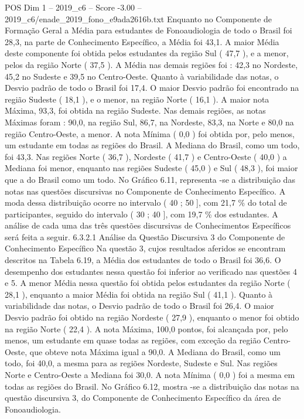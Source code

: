\begin{textsample}{POS Dim 1 – 2019\_c6 – Score -3.00 – 2019\_c6/enade\_2019\_fono\_e9ada2616b.txt}
Enquanto no Componente de Formação Geral a Média para estudantes de Fonoaudiologia de todo o Brasil foi 28,3, na parte de Conhecimento Específico, a Média foi 43,1.
A maior Média deste componente foi obtida pelos estudantes da região Sul ( 47,7 ), e a menor, pelos da região Norte ( 37,5 ).
A Média nas demais regiões foi : 42,3 no Nordeste, 45,2 no Sudeste e 39,5 no Centro-Oeste.
Quanto à variabilidade das notas, o Desvio padrão de todo o Brasil foi 17,4.
O maior Desvio padrão foi encontrado na região Sudeste ( 18,1 ), e o menor, na região Norte ( 16,1 ).
A maior nota Máxima, 93,3, foi obtida na região Sudeste.
Nas demais regiões, as notas Máximas foram : 90,0, na região Sul, 86,7, na Nordeste, 83,3, na Norte e 80,0 na região Centro-Oeste, a menor.
A nota Mínima ( 0,0 ) foi obtida por, pelo menos, um estudante em todas as regiões do Brasil.
A Mediana do Brasil, como um todo, foi 43,3.
Nas regiões Norte ( 36,7 ), Nordeste ( 41,7 ) e Centro-Oeste ( 40,0 ) a Mediana foi menor, enquanto nas regiões Sudeste ( 45,0 ) e Sul ( 48,3 ), foi maior que a do Brasil como um todo.
No Gráfico 6.11, representa -se a distribuição das notas nas questões discursivas no Componente de Conhecimento Específico.
A moda dessa distribuição ocorre no intervalo ( 40 ; 50 ], com 21,7 \% do total de participantes, seguido do intervalo ( 30 ; 40 ], com 19,7 \% dos estudantes.
A análise de cada uma das três questões discursivas de Conhecimentos Específicos será feita a seguir. 6.3.2.1 Análise da Questão Discursiva 3 do Componente de Conhecimento Específico Na questão 3, cujos resultados aferidos se encontram descritos na Tabela 6.19, a Média dos estudantes de todo o Brasil foi 36,6.
O desempenho dos estudantes nessa questão foi inferior ao verificado nas questões 4 e 5.
A menor Média nessa questão foi obtida pelos estudantes da região Norte ( 28,1 ), enquanto a maior Média foi obtida na região Sul ( 41,1 ).
Quanto à variabilidade das notas, o Desvio padrão de todo o Brasil foi 26,4.
O maior Desvio padrão foi obtido na região Nordeste ( 27,9 ), enquanto o menor foi obtido na região Norte ( 22,4 ).
A nota Máxima, 100,0 pontos, foi alcançada por, pelo menos, um estudante em quase todas as regiões, com exceção da região Centro-Oeste, que obteve nota Máxima igual a 90,0.
A Mediana do Brasil, como um todo, foi 40,0, a mesma para as regiões Nordeste, Sudeste e Sul.
Nas regiões Norte e Centro-Oeste a Mediana foi 30,0.
A nota Mínima ( 0,0 ) foi a mesma em todas as regiões do Brasil.
No Gráfico 6.12, mostra -se a distribuição das notas na questão discursiva 3, do Componente de Conhecimento Específico da área de Fonoaudiologia.

\end{textsample}
